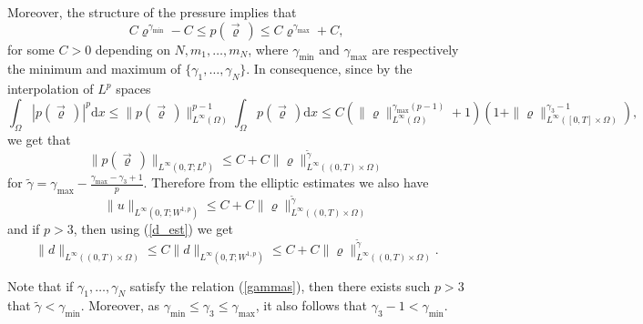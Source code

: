 \documentclass[11pt]{article}
\newcommand{\dd}{\mathrm{d}}
\numberwithin{equation}{section}
\numberwithin{tw}{section}
\begin{document}

\noindent Moreover, the structure of the pressure implies that
\begin{equation}\label{p_rho} C\varrho^{\gamma_{\min}}-C\leq p(\vec\varrho\,) \leq C\varrho^{\gamma_{\max}}+C, \end{equation}
for some $C>0$ depending on $N,m_1,\dots,m_N$, where $\gamma_{\min}$ and $\gamma_{\max}$ are respectively the minimum and maximum of $\{\gamma_1,\dots,\gamma_N\}$. In consequence, since by the interpolation of $L^p$ spaces
\[ \int_\Omega |p(\vec\varrho\,)|^p\dd x \leq \|p(\vec\varrho\,)\|_{L^\infty(\Omega)}^{p-1}\int_\Omega p(\vec\varrho\,)\dd x \leq C(\|\varrho\|_{L^\infty(\Omega)}^{\gamma_{\max}(p-1)}+1)(1+\|\varrho\|_{L^\infty([0,T]\times\Omega)}^{\gamma_3-1}), \]
we get that 
\[ \|p(\vec\varrho\,)\|_{L^\infty(0,T;L^p)} \leq C+C\|\varrho\|_{L^\infty((0,T)\times\Omega)}^{\tilde\gamma} \]
for $\tilde\gamma = \gamma_{\max}-\frac{\gamma_{\max}-\gamma_3+1}{p}$.
Therefore from the elliptic estimates we also have
\[ \|u\|_{L^\infty(0,T;W^{1,p})} \leq C+C\|\varrho\|_{L^\infty((0,T)\times\Omega)}^{\tilde\gamma} \]
and if $p>3$, then using (\ref{d_est}) we get
\begin{equation}\label{d_infty} \|d\|_{L^\infty((0,T)\times\Omega)} \leq C\|d\|_{L^\infty(0,T;W^{1,p})} \leq C+C\|\varrho\|_{L^\infty((0,T)\times\Omega)}^{\tilde\gamma}. \end{equation}

Note that if $\gamma_1,\dots,\gamma_N$ satisfy the relation (\ref{gammas}), then there exists such $p>3$ that $\tilde\gamma < \gamma_{\min}$. Moreover, as $\gamma_{\min}\leq \gamma_3 \leq \gamma_{\max}$, it also follows that $\gamma_3-1<\gamma_{\min}$.
\end{document}
